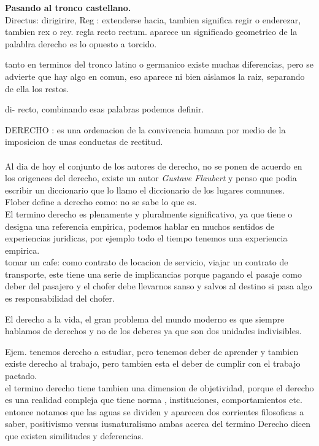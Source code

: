 \documentclass[12pt]{book}
\begin{document}
\textbf{Pasando al tronco castellano.}
\\
Directus: dirigirire, 
Reg : extenderse hacia, tambien significa regir o enderezar, tambien rex o rey.  regla recto rectum.
aparece un significado geometrico de la palablra derecho es lo opuesto a torcido.

tanto en terminos del tronco latino o germanico existe muchas diferencias, pero se advierte que hay algo  en comun, eso aparece ni bien aislamos la raiz, separando de ella los restos.

di- recto, combinando esas palabras podemos definir.

DERECHO : es una ordenacion de la convivencia humana por medio de la imposicion de unas conductas de rectitud.
\\
\\
Al dia de hoy el conjunto de los autores de derecho, no se ponen de acuerdo en los origenees del derecho, existe un autor \textit{Gustave Flaubert} y penso que podia escribir un diccionario que lo llamo el diccionario de los lugares comnunes.
\\
Flober define a derecho como: no se sabe lo que es.
\\
El termino derecho es plenamente y pluralmente significativo, ya que tiene o designa una referencia empirica, podemos hablar en muchos sentidos de experiencias juridicas, por ejemplo todo el tiempo tenemos una experiencia empirica.
\\
tomar un cafe: como contrato de locacion de servicio, viajar un contrato de transporte, este tiene una serie de implicancias porque pagando el pasaje como deber del pasajero y el chofer debe llevarnos sanso y salvos al destino si pasa algo es responsabilidad del chofer.

El derecho a la vida, el gran problema del mundo moderno es que siempre hablamos de derechos y no de los deberes ya que son dos unidades indivisibles.

Ejem. tenemos derecho a estudiar, pero tenemos deber de aprender y tambien existe derecho al trabajo, pero tambien esta el deber de cumplir con el trabajo pactado.
\\
el termino derecho tiene tambien una dimension de objetividad, porque el derecho es una realidad compleja que tiene norma , instituciones, comportamientos etc.
entonce notamos que las aguas se dividen y aparecen dos corrientes filosoficas a saber, positivismo versus iusnaturalismo ambas acerca del termino Derecho dicen que existen similitudes y deferencias.
\end{document}
